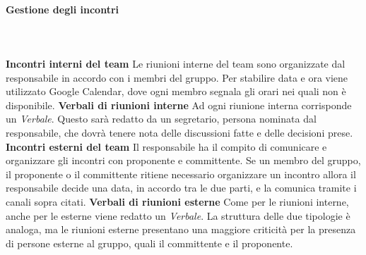 			\paragraph{Gestione degli incontri} \mbox{}\\ \mbox{}\\
			\textbf{Incontri interni del team} \newline \newline
			Le riunioni interne del team sono organizzate dal responsabile in accordo con i membri del gruppo. Per stabilire data e ora viene utilizzato Google Calendar, dove ogni membro segnala gli orari nei quali non è disponibile. \newline \newline
			\textbf{Verbali di riunioni interne} \newline \newline
			Ad ogni riunione interna corrisponde un \textit{Verbale}. Questo sarà redatto da un segretario, persona nominata dal responsabile, che dovrà tenere nota delle discussioni fatte e delle decisioni prese. \newline \newline
			\textbf{Incontri esterni del team} \newline \newline
			Il responsabile ha il compito di comunicare e organizzare gli incontri con proponente e committente. Se un membro del gruppo, il proponente o il committente ritiene necessario organizzare un incontro allora il responsabile decide una data, in accordo tra le due parti, e la comunica tramite i canali sopra citati.
			\newline \newline
			\textbf{Verbali di riunioni esterne} \newline \newline
			Come per le riunioni interne, anche per le esterne viene redatto un \textit{Verbale}. La struttura delle due tipologie è analoga, ma le riunioni esterne presentano una maggiore criticità per la presenza di persone esterne al gruppo, quali il committente e il proponente. 
